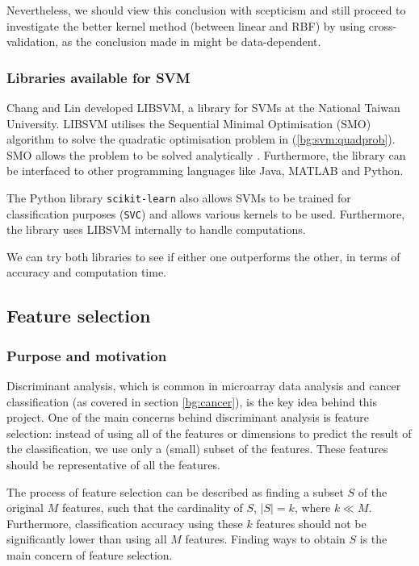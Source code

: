 \documentclass[12pt, twoside, a4paper]{article}
\begin{document}
Nevertheless, we should view this conclusion with scepticism and still proceed to investigate the better kernel method (between linear and RBF) by using cross-validation, as the conclusion made in \cite{RefWorks:128} might be data-dependent.

\subsubsection{Libraries available for SVM}
Chang and Lin \cite{libsvm} developed LIBSVM, a library for SVMs at the National Taiwan University. LIBSVM utilises the Sequential Minimal Optimisation (SMO) algorithm to solve the quadratic optimisation problem in (\ref{bg:svm:quadprob}). SMO allows the problem to be solved analytically \cite{RefWorks:126}. Furthermore, the library can be interfaced to other programming languages like Java, MATLAB and Python.

The Python library \texttt{scikit-learn} also allows SVMs to be trained for classification purposes (\texttt{SVC}) and allows various kernels to be used. Furthermore, the library uses LIBSVM internally to handle computations.

We can try both libraries to see if either one outperforms the other, in terms of accuracy and computation time.

\subsection{Feature selection} \label{bg:feature_selection}

\subsubsection{Purpose and motivation} \label{bg:fs:purpose}

Discriminant analysis, which is common in microarray data analysis and cancer classification (as covered in section \ref{bg:cancer}), is the key idea behind this project. One of the main concerns behind discriminant analysis is feature selection: instead of using all of the features or dimensions to predict the result of the classification, we use only a (small) subset of the features. These features should be representative of all the features.

The process of feature selection can be described as finding a subset $S$ of the original $M$ features, such that the cardinality of $S$, $|S|=k$, where $k \ll M$. Furthermore, classification accuracy using these $k$ features should not be significantly lower than using all $M$ features. Finding ways to obtain $S$ is the main concern of feature selection.
\end{document}
